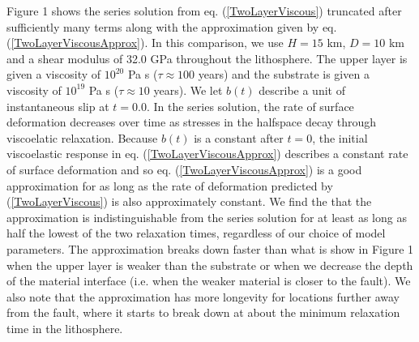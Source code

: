 \documentclass[extra,mreferee]{gji}
\begin{document}
Figure 1 shows the series solution from eq. (\ref{TwoLayerViscous})
truncated after sufficiently many terms along with the approximation
given by eq. (\ref{TwoLayerViscousApprox}). In this comparison, we use
$H=15$ km, $D=10$ km and a shear modulus of 32.0 GPa throughout the
lithosphere.  The upper layer is given a viscosity of $10^{20}$ Pa s
($\tau\approx 100$ years) and the substrate is given a viscosity of
$10^{19}$ Pa s ($\tau\approx 10$ years).  We let $b(t)$ describe a unit
of instantaneous slip at $t=0.0$.  In the series solution, the rate of
surface deformation decreases over time as stresses in the halfspace
decay through viscoelatic relaxation.  Because $b(t)$ is a constant
after $t=0$, the initial viscoelastic response in
eq. (\ref{TwoLayerViscousApprox}) describes a constant rate of
surface deformation and so eq. (\ref{TwoLayerViscousApprox}) is a good
approximation for as long as the rate of deformation predicted by
(\ref{TwoLayerViscous}) is also approximately constant. We find the
that the approximation is indistinguishable from the series solution
for at least as long as half the lowest of the two relaxation times,
regardless of our choice of model parameters.  The approximation
breaks down faster than what is show in Figure 1 when the upper layer
is weaker than the substrate or when we decrease the depth of the
material interface (i.e. when the weaker material is closer to the
fault).  We also note that the approximation has more longevity for
locations further away from the fault, where it starts to break down
at about the minimum relaxation time in the lithosphere.
\end{document}
